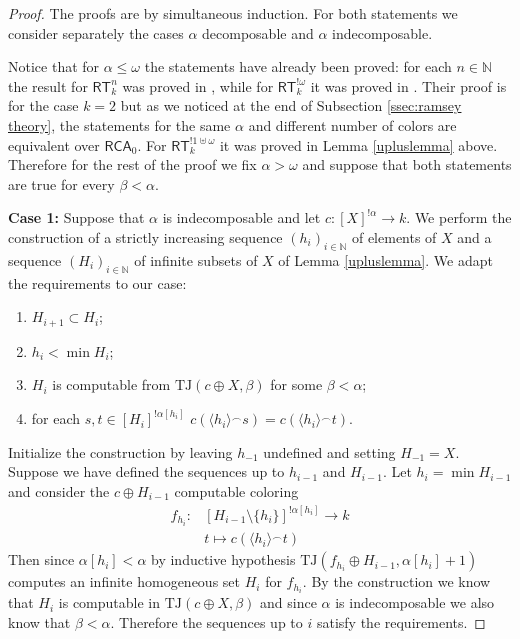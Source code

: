 \documentclass[11pt]{amsart}
\theoremstyle{definition}
\theoremstyle{remark}
\theoremstyle{plain}
\newcommand{\numberset}{\mathbb}
\newcommand{\N}{\numberset{N}}
\def\om{\omega}
\def\a{\alpha}
\def\b{\beta}
\def\conc{{}^\smallfrown}
\newcommand{\RCA}{\mathsf{RCA}_0}
\newcommand{\RT}{\mathsf{RT}}
\newcommand{\TJ}{\mathsf{TJ}}
\def\TJ{{\textrm{TJ}}}
\def\N{{\mathbb{N}}}
\begin{document}
\begin{proof}
The proofs are by simultaneous induction.
For both statements we consider separately the cases $\a$ decomposable and $\a$ indecomposable.

Notice that for $\a \le \om$ the statements have already been proved: for each $n \in \N$ the result for $\RT^n_k$ was proved in \cite{jockusch}, while for $\RT^{! \omega}_k$ it was proved in \cite{carlucci2014}.
Their proof is for the case $k=2$ but as we noticed at the end of Subsection \ref{ssec:ramsey theory}, the statements for the same $\a$ and different number of colors are equivalent over $\RCA$. 
For $\RT^{! 1 \uplus \omega}_k$ it was proved in Lemma \ref{upluslemma} above.
Therefore for the rest of the proof we fix $\alpha > \omega$ and suppose that both statements are true for every $\beta < \alpha$.

\medskip

\textbf{Case 1:} Suppose that $\alpha$ is indecomposable and let $c \colon [X]^{! \alpha} \to k$.
We perform the construction of a strictly increasing sequence $(h_i)_{i \in \N}$ of elements of $X$ and a sequence $(H_i)_{i \in \N}$ of infinite subsets of $X$ of Lemma \ref{upluslemma}.
We adapt the requirements to our case:
\begin{enumerate}
    \item $H_{i+1} \subset H_i$;
    \item $h_i < \min H_i$;
    \item $H_i$ is computable from $\TJ(c \oplus X, \b)$ for some $\beta < \alpha$;
    \item for each $s,t \in [H_i]^{! \alpha[h_i]}$ $c(\langle h_i \rangle \conc s) = c(\langle h_i \rangle \conc t)$.
\end{enumerate}

Initialize the construction by leaving $h_{-1}$ undefined and setting $H_{-1} = X$.
Suppose we have defined the sequences up to $h_{i-1}$ and $H_{i-1}$.
Let $h_i = \min H_{i-1}$ and consider the $c \oplus H_{i-1}$ computable coloring
\begin{align*}
    f_{h_i} \colon & [H_{i-1} \setminus \{h_i\}]^{! \alpha[h_i]} \to k \\
     & t \mapsto c(\langle h_i \rangle \conc t)
\end{align*}
Then since $\alpha[h_i] < \alpha$ by inductive hypothesis $\TJ(f_{h_i} \oplus H_{i-1}, \alpha[h_i] + 1)$ computes an infinite homogeneous set $H_i$ for $f_{h_i}$.
By the construction we know that $H_i$ is computable in $\TJ(c \oplus X, \b)$ and since $\alpha$ is indecomposable we also know that $\beta < \alpha$.
Therefore the sequences up to $i$ satisfy the requirements.


\end{proof}
\end{document}
